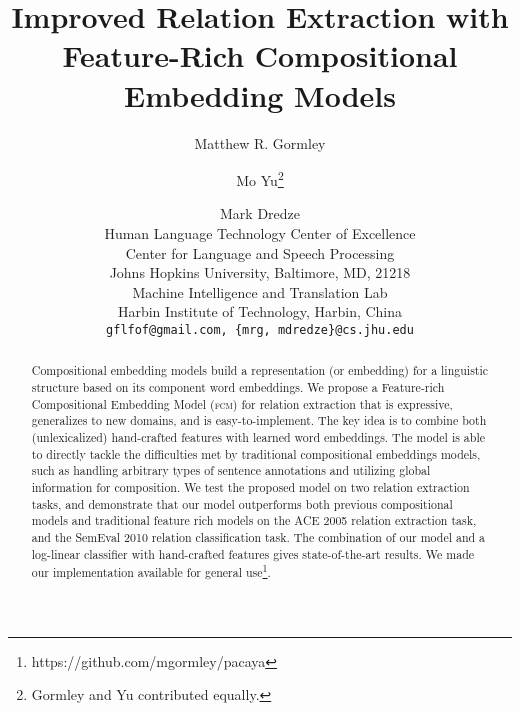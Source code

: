 \documentclass[11pt,a4paper]{article}
\title{Improved Relation Extraction with\\Feature-Rich Compositional Embedding Models}
\author{
Matthew R. Gormley \and Mo Yu\thanks{Gormley and Yu contributed equally.} \and  Mark Dredze\\
Human Language Technology Center of Excellence\\
 Center for Language and Speech Processing \\
 Johns Hopkins University, Baltimore, MD, 21218 \\
Machine Intelligence and Translation Lab\\
Harbin Institute of Technology, Harbin, China \\
\texttt{gflfof@gmail.com, \{mrg, mdredze\}@cs.jhu.edu} \\
}
\date{}
\newcommand{\fct}{\textsc{fcm}}
\begin{document}
\maketitle
\begin{abstract}
  Compositional embedding models build a representation (or embedding)
  for a linguistic structure based on its component word embeddings.
  We propose a Feature-rich Compositional Embedding Model (\fct{}) for relation extraction that is expressive,
  generalizes to new domains, and is easy-to-implement. The key idea is to
  combine both (unlexicalized) hand-crafted features with 
  learned word embeddings. The model is able to directly tackle the difficulties met by
  traditional compositional embeddings models, such as handling
  arbitrary types of sentence annotations and utilizing global
  information for composition.  We test the proposed model on two relation
  extraction tasks, and demonstrate that our model outperforms both 
  previous compositional models and traditional feature rich models
  on the ACE 2005 relation extraction task, and the SemEval 2010 relation
  classification task. The combination of our model and a log-linear classifier
  with hand-crafted features gives state-of-the-art results.
  We made our implementation available for general use\footnote{https://github.com/mgormley/pacaya}.
\end{abstract}









\newcommand{\colorA}[1]{{\color{BrickRed}#1}}
\newcommand{\colorB}[1]{{\color{Orange}#1}}
\newcommand{\colorC}[1]{{\color{Green}#1}}
\end{document}
